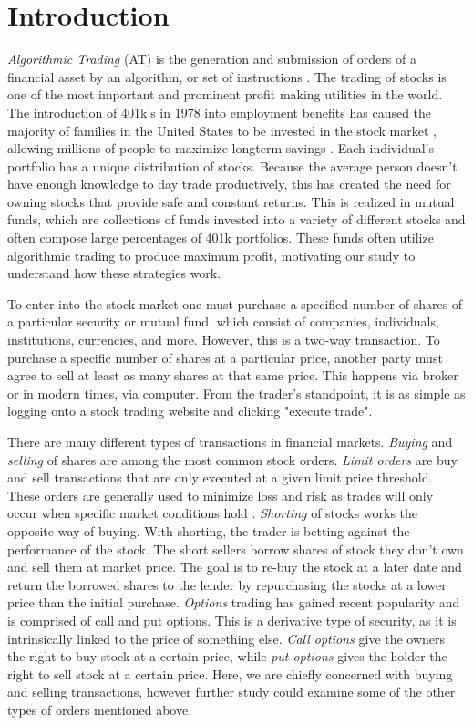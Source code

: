 \documentclass[../thesis.tex]{subfiles}
\begin{document}
\chapter{Introduction}
\label{ch:intro}

\textit{Algorithmic Trading} (AT) is the generation and submission of orders of a financial asset by an algorithm, or set of instructions \cite{Treleaven2013}. The trading of stocks is one of the most important and prominent profit making utilities in the world. The introduction of 401k's in 1978 into employment benefits has caused the majority of families in the United States to be invested in the stock market \cite{Stobierski2018}, allowing millions of people to maximize longterm savings \cite{Treleaven2013}. Each individual's portfolio has a unique distribution of stocks. Because the average person doesn't have enough knowledge to day trade productively, this has created the need for owning stocks that provide safe and constant returns. This is realized in mutual funds, which are collections of funds invested into a variety of different stocks and often compose large percentages of 401k portfolios. These funds often utilize algorithmic trading to produce maximum profit, motivating our study to understand how these strategies work.

To enter into the stock market one must purchase a specified number of shares of a particular security or mutual fund, which consist of companies, individuals, institutions, currencies, and more. However, this is a two-way transaction. To purchase a specific number of shares at a particular price, another party must agree to sell at least as many shares at that same price. This happens via broker or in modern times, via computer. From the trader's standpoint, it is as simple as logging onto a stock trading website and clicking "execute trade". 

There are many different types of transactions in financial markets. \textit{Buying} and \textit{selling} of shares are among the most common stock orders. \textit {Limit orders} are buy and sell transactions that are only executed at a given limit price threshold. These orders are generally used to minimize loss and risk as trades will only occur when specific market conditions hold \cite{Aldridge2010}. \textit{Shorting} of stocks works the opposite way of buying. With shorting, the trader is betting against the performance of the stock. The short sellers borrow shares of stock they don't own and sell them at market price. The goal is to re-buy the stock at a later date and return the borrowed shares to the lender by repurchasing the stocks at a lower price than the initial purchase. \textit {Options} trading has gained recent popularity and is comprised of call and put options. This is a derivative type of security, as it is intrinsically linked to the price of something else. \textit {Call options} give the owners the right to buy stock at a certain price, while \textit{put options} gives the holder the right to sell stock at a certain price. Here, we are chiefly concerned with buying and selling transactions, however further study could examine some of the other types of orders mentioned above. 
\end{document}
